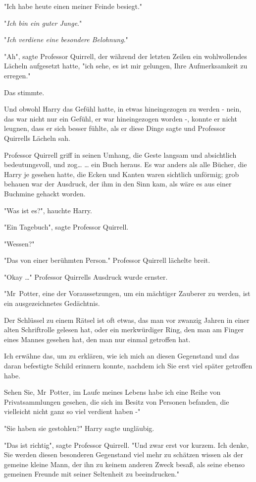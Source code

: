{"Ich habe heute einen meiner Feinde besiegt."

"\emph{Ich bin ein guter Junge}."

"\emph{Ich verdiene eine besondere Belohnung}."

"Ah", sagte Professor Quirrell, der während der letzten Zeilen ein wohlwollendes Lächeln aufgesetzt hatte, "ich sehe, es ist mir gelungen, Ihre Aufmerksamkeit zu erregen."

Das stimmte.

Und obwohl Harry das Gefühl hatte, in etwas hineingezogen zu werden - nein, das war nicht nur ein Gefühl, er war hineingezogen worden -, konnte er nicht leugnen, dass er sich besser fühlte, als er diese Dinge sagte und Professor Quirrells Lächeln sah.

Professor Quirrell griff in seinen Umhang, die Geste langsam und absichtlich bedeutungsvoll, und zog… … ein Buch heraus. Es war anders als alle Bücher, die Harry je gesehen hatte, die Ecken und Kanten waren sichtlich unförmig; grob behauen war der Ausdruck, der ihm in den Sinn kam, als wäre es aus einer Buchmine gehackt worden.

"Was ist es?", hauchte Harry.

"Ein Tagebuch", sagte Professor Quirrell.

"Wessen?"

"Das von einer berühmten Person." Professor Quirrell lächelte breit.

"Okay …" Professor Quirrells Ausdruck wurde ernster.

"Mr~Potter, eine der Voraussetzungen, um ein mächtiger Zauberer zu werden, ist ein ausgezeichnetes Gedächtnis.

Der Schlüssel zu einem Rätsel ist oft etwas, das man vor zwanzig Jahren in einer alten Schriftrolle gelesen hat, oder ein merkwürdiger Ring, den man am Finger eines Mannes gesehen hat, den man nur einmal getroffen hat.

Ich erwähne das, um zu erklären, wie ich mich an diesen Gegenstand und das daran befestigte Schild erinnern konnte, nachdem ich Sie erst viel später getroffen habe.

Sehen Sie, Mr~Potter, im Laufe meines Lebens habe ich eine Reihe von Privatsammlungen gesehen, die sich im Besitz von Personen befanden, die vielleicht nicht ganz so viel verdient haben -"

"Sie haben sie gestohlen?" Harry sagte ungläubig.

"Das ist richtig", sagte Professor Quirrell. "Und zwar erst vor kurzem. Ich denke, Sie werden diesen besonderen Gegenstand viel mehr zu schätzen wissen als der gemeine kleine Mann, der ihn zu keinem anderen Zweck besaß, als seine ebenso gemeinen Freunde mit seiner Seltenheit zu beeindrucken."

}
